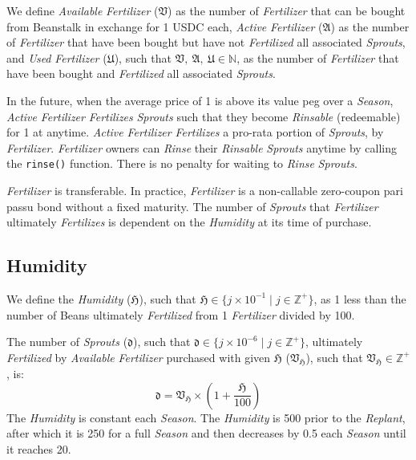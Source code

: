 \documentclass[tikz]{article}
\newcommand{\code}[1]{\texttt{#1}}
\newcommand{\term}[1]{\textsl{#1}}
\newcommand{\Bean}{} %
\begin{document}
We define \term{Available} \term{Fertilizer} ($\mathfrak{V}$) as the number of \term{Fertilizer} that can be bought from Beanstalk in exchange for 1 USDC each, \term{Active} \term{Fertilizer} ($\mathfrak{A}$) as the number of \term{Fertilizer} that have been bought but have not \term{Fertilized} all associated \term{Sprouts}, and \term{Used} \term{Fertilizer} ($\mathfrak{U}$), such that $\mathfrak{V},\ \mathfrak{A},\ \mathfrak{U} \in \mathbb{N}$, as the number of \term{Fertilizer} that have been bought and \term{Fertilized} all associated \term{Sprouts}. 

In the future, when the average price of \Bean1 is above its value peg over a \term{Season}, \term{Active} \term{Fertilizer} \term{Fertilizes} \term{Sprouts} such that they become \term{Rinsable} (redeemable) for \Bean1 at anytime. \term{Active} \term{Fertilizer} \term{Fertilizes} a pro-rata portion of \term{Sprouts}, by \term{Fertilizer}. \term{Fertilizer} owners can \term{Rinse} their \term{Rinsable} \term{Sprouts} anytime by calling the \code{rinse()} function. There is no penalty for waiting to \term{Rinse} \term{Sprouts}.

\term{Fertilizer} is transferable. In practice, \term{Fertilizer} is a non-callable zero-coupon pari passu bond without a fixed maturity. The number of \term{Sprouts} that \term{Fertilizer} ultimately \term{Fertilizes} is dependent on the \term{Humidity} at its time of purchase.

\subsection{Humidity}
We define the \term{Humidity} ($\mathfrak{H}$), such that $\mathfrak{H} \in \{j \times 10^{-1} \mid j \in \mathbb{Z}^{+} \}$, as 1 less than the number of Beans ultimately \term{Fertilized} from 1 \term{Fertilizer} divided by 100. 

The number of \term{Sprouts} ($\mathfrak{d}$), such that $\mathfrak{d} \in \{j \times 10^{-6} \mid j \in \mathbb{Z}^{+} \}$, ultimately \term{Fertilized} by \term{Available} \term{Fertilizer} purchased with given $\mathfrak{H}$ ($\mathfrak{V}_\mathfrak{H}$), such that $\mathfrak{V}_\mathfrak{H} \in \mathbb{Z}^{+}$, is:
$$\mathfrak{d} = \mathfrak{V}_\mathfrak{H} \times \left(1 + \frac{\mathfrak{H}}{100}\right)$$
The \term{Humidity} is constant each \term{Season}. The \term{Humidity} is 500 prior to the \term{Replant}, after which it is 250 for a full \term{Season} and then decreases by 0.5 each \term{Season} until it reaches 20.
\end{document}
